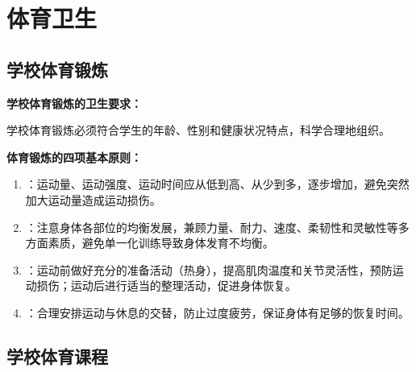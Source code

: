 \section{体育卫生}

\subsection{学校体育锻炼}

\begin{keybox}
\textbf{学校体育锻炼的卫生要求：}

学校体育锻炼必须符合学生的年龄、性别和健康状况特点，科学合理地组织。

\textbf{体育锻炼的四项基本原则：}

\begin{enumerate}[leftmargin=*]
    \item {}：运动量、运动强度、运动时间应从低到高、从少到多，逐步增加，避免突然加大运动量造成运动损伤。
    \item {}：注意身体各部位的均衡发展，兼顾力量、耐力、速度、柔韧性和灵敏性等多方面素质，避免单一化训练导致身体发育不均衡。
    \item {}：运动前做好充分的准备活动（热身），提高肌肉温度和关节灵活性，预防运动损伤；运动后进行适当的整理活动，促进身体恢复。
    \item {}：合理安排运动与休息的交替，防止过度疲劳，保证身体有足够的恢复时间。
\end{enumerate}
\end{keybox}

\subsection{学校体育课程}

